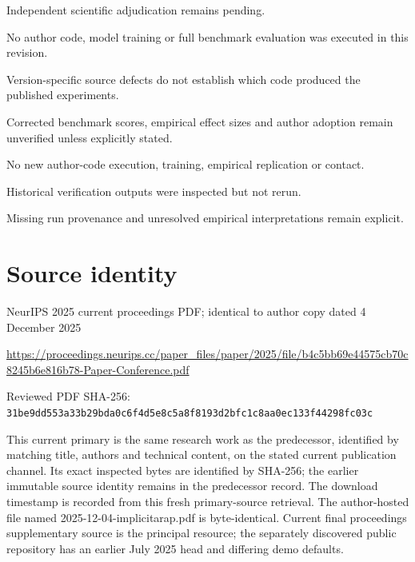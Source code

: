 \documentclass[11pt]{article}
\begin{document}
Independent scientific adjudication remains pending.\par

No author code, model training or full benchmark evaluation was executed in this revision.\par

Version-specific source defects do not establish which code produced the published experiments.\par

Corrected benchmark scores, empirical effect sizes and author adoption remain unverified unless explicitly stated.\par

No new author-code execution, training, empirical replication or contact.\par

Historical verification outputs were inspected but not rerun.\par

Missing run provenance and unresolved empirical interpretations remain explicit.\par

\section*{Source identity}

NeurIPS 2025 current proceedings PDF; identical to author copy dated 4 December 2025

\url{https://proceedings.neurips.cc/paper_files/paper/2025/file/b4c5bb69e44575cb70c8245b6e816b78-Paper-Conference.pdf}

Reviewed PDF SHA-256: \nolinkurl{31be9dd553a33b29bda0c6f4d5e8c5a8f8193d2bfc1c8aa0ec133f44298fc03c}

This current primary is the same research work as the predecessor, identified by matching title, authors and technical content, on the stated current publication channel. Its exact inspected bytes are identified by SHA-256; the earlier immutable source identity remains in the predecessor record. The download timestamp is recorded from this fresh primary-source retrieval. The author-hosted file named 2025-12-04-implicitarap.pdf is byte-identical. Current final proceedings supplementary source is the principal resource; the separately discovered public repository has an earlier July 2025 head and differing demo defaults.
\end{document}
